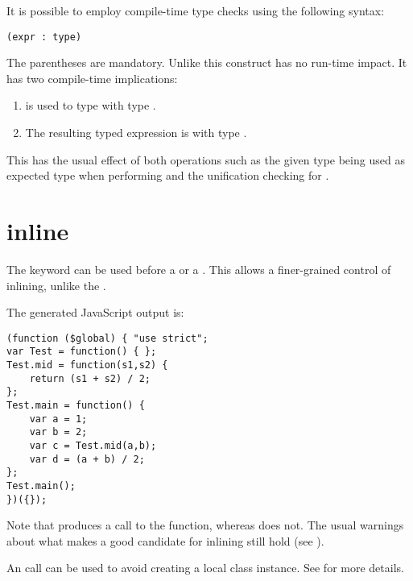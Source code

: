 It is possible to employ compile-time type checks using the following syntax:

\begin{lstlisting}
(expr : type)
\end{lstlisting}

The parentheses are mandatory. Unlike  this construct has no run-time impact. It has two compile-time implications:

\begin{enumerate}
\item {} is used to type  with type .
\item The resulting typed expression is  with type .
\end{enumerate}

This has the usual effect of both operations such as the given type being used as expected type when performing  and the unification checking for .


\section{inline}
\label{expression-inline}

The  keyword can be used before a  or a . This allows a finer-grained control of inlining, unlike the .


The generated JavaScript output is:

\begin{lstlisting}
(function ($global) { "use strict";
var Test = function() { };
Test.mid = function(s1,s2) {
	return (s1 + s2) / 2;
};
Test.main = function() {
	var a = 1;
	var b = 2;
	var c = Test.mid(a,b);
	var d = (a + b) / 2;
};
Test.main();
})({});
\end{lstlisting}

Note that  produces a call to the function, whereas  does not. The usual warnings about what makes a good candidate for inlining still hold (see ).

An  call can be used to avoid creating a local class instance. See  for more details.

